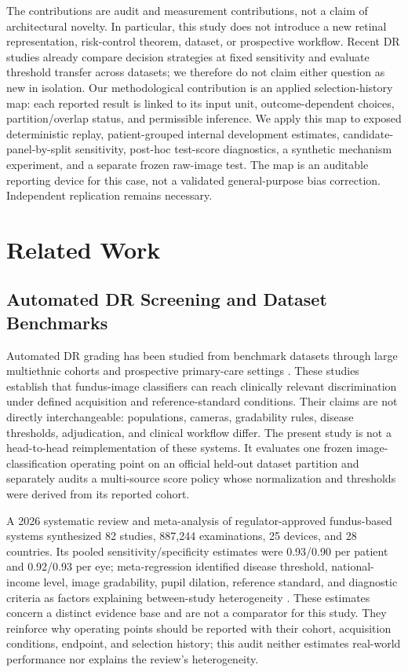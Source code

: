 \documentclass{ieeeaccess}
\begin{document}
The contributions are audit and measurement contributions, not a claim of architectural novelty. In particular, this study does not introduce a new retinal representation, risk-control theorem, dataset, or prospective workflow. Recent DR studies already compare decision strategies at fixed sensitivity and evaluate threshold transfer across datasets; we therefore do not claim either question as new in isolation. Our methodological contribution is an applied selection-history map: each reported result is linked to its input unit, outcome-dependent choices, partition/overlap status, and permissible inference. We apply this map to exposed deterministic replay, patient-grouped internal development estimates, candidate-panel-by-split sensitivity, post-hoc test-score diagnostics, a synthetic mechanism experiment, and a separate frozen raw-image test. The map is an auditable reporting device for this case, not a validated general-purpose bias correction. Independent replication remains necessary.

\section{Related Work}
\subsection{Automated DR Screening and Dataset Benchmarks}
Automated DR grading has been studied from benchmark datasets through large multiethnic cohorts and prospective primary-care settings \cite{gulshan2016,ting2017,abramoff2018,bellemo2019}. These studies establish that fundus-image classifiers can reach clinically relevant discrimination under defined acquisition and reference-standard conditions. Their claims are not directly interchangeable: populations, cameras, gradability rules, disease thresholds, adjudication, and clinical workflow differ. The present study is not a head-to-head reimplementation of these systems. It evaluates one frozen image-classification operating point on an official held-out dataset partition and separately audits a multi-source score policy whose normalization and thresholds were derived from its reported cohort.

A 2026 systematic review and meta-analysis of regulator-approved fundus-based systems synthesized 82 studies, 887,244 examinations, 25 devices, and 28 countries. Its pooled sensitivity/specificity estimates were 0.93/0.90 per patient and 0.92/0.93 per eye; meta-regression identified disease threshold, national-income level, image gradability, pupil dilation, reference standard, and diagnostic criteria as factors explaining between-study heterogeneity \cite{wang2026approveddr}. These estimates concern a distinct evidence base and are not a comparator for this study. They reinforce why operating points should be reported with their cohort, acquisition conditions, endpoint, and selection history; this audit neither estimates real-world performance nor explains the review's heterogeneity.
\end{document}
